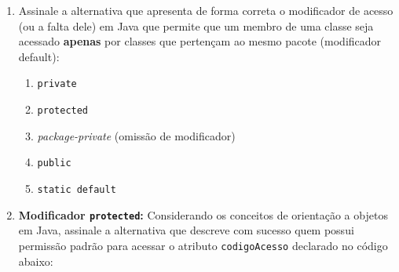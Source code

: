 \documentclass[12pt,a4paper]{article}
\begin{document}
\begin{enumerate}
    Considerando o código da classe \texttt{EstufaInteligente}, julgue as afirmações como Verdadeiras (V) ou Falsas (F) e assinale a sequência \textbf{correta}:

    ( ) O método \texttt{umidadeIdeal} (linhas 33-35) é privado, o que significa que ele só pode ser invocado internamente pelos métodos da própria classe. \\
    ( ) Na chamada do método \texttt{irrigar}, a verificação de segurança é sempre ativada internamente e garante o desligamento automático do equipamento caso a umidade supere o limite máximo permitido. \\
    ( ) O processo de colher frutos (linha 26) acontece independentemente de o sistema da estufa estar ligado ou desligado. \\
    ( ) É plenamente possível que uma classe em outro pacote altere de forma direta e irrestrita o valor do atributo \texttt{aguaConsumida}.

    \begin{enumerate}[label=\Alph*)]
        \item V - V - F - F.
        \item V - F - V - V.
        \item F - V - V - F.
        \item V - V - V - F.
        \item F - F - F - V.
    \end{enumerate}


    \vspace{0.3cm}


    \item Assinale a alternativa que apresenta de forma correta o modificador de acesso (ou a falta dele) em Java que permite que um membro de uma classe seja acessado \textbf{apenas} por classes que pertençam ao mesmo pacote (modificador default):
    \begin{enumerate}[label=\Alph*)]
        \item \texttt{private}
        \item \texttt{protected}
        \item \textit{package-private} (omissão de modificador)
        \item \texttt{public}
        \item \texttt{static default}
    \end{enumerate}

    \vspace{0.3cm}

    \item \textbf{Modificador \texttt{protected}:} Considerando os conceitos de orientação a objetos em Java, assinale a alternativa que descreve com sucesso quem possui permissão padrão para acessar o atributo \texttt{codigoAcesso} declarado no código abaixo:


\end{enumerate}
\end{document}

